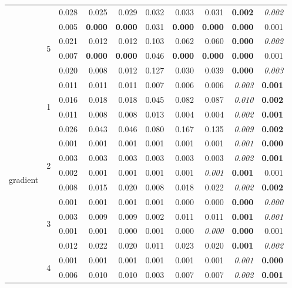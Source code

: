 \documentclass[authoryear, review, 11pt]{elsarticle}
\begin{document}
\begin{table}
\begin{center}
{\begin{tabular}{ccrrrrrrrr}
   &  & 0.028 & 0.025 & 0.029 & 0.032 & 0.033 & 0.031 & \textbf{0.002} & \emph{0.002} \\ 
  \cline{3-10}
   & \multirow{4}{*}{5} & 0.005 & \textbf{0.000} & \textbf{0.000} & 0.031 & \textbf{0.000} & \textbf{0.000} & \textbf{0.000} & 0.001 \\ 
   &  & 0.021 & 0.012 & 0.012 & 0.103 & 0.062 & 0.060 & \textbf{0.000} & \emph{0.002} \\ 
   &  & 0.007 & \textbf{0.000} & \textbf{0.000} & 0.046 & \textbf{0.000} & \textbf{0.000} & \textbf{0.000} & 0.001 \\ 
   &  & 0.020 & 0.008 & 0.012 & 0.127 & 0.030 & 0.039 & \textbf{0.000} & \emph{0.003} \\ 
  \hline
  \multirow{20}{*}{gradient} & \multirow{4}{*}{1} & 0.011 & 0.011 & 0.011 & 0.007 & 0.006 & 0.006 & \emph{0.003} & \textbf{0.001} \\ 
   &  & 0.016 & 0.018 & 0.018 & 0.045 & 0.082 & 0.087 & \emph{0.010} & \textbf{0.002} \\ 
   &  & 0.011 & 0.008 & 0.008 & 0.013 & 0.004 & 0.004 & \emph{0.002} & \textbf{0.001} \\ 
   &  & 0.026 & 0.043 & 0.046 & 0.080 & 0.167 & 0.135 & \emph{0.009} & \textbf{0.002} \\ 
  \cline{3-10}
   & \multirow{4}{*}{2} & 0.001 & 0.001 & 0.001 & 0.001 & 0.001 & 0.001 & \emph{0.001} & \textbf{0.000} \\ 
   &  & 0.003 & 0.003 & 0.003 & 0.003 & 0.003 & 0.003 & \emph{0.002} & \textbf{0.001} \\ 
   &  & 0.002 & 0.001 & 0.001 & 0.001 & 0.001 & \emph{0.001} & \textbf{0.001} & 0.001 \\ 
   &  & 0.008 & 0.015 & 0.020 & 0.008 & 0.018 & 0.022 & \emph{0.002} & \textbf{0.002} \\ 
  \cline{3-10}
   & \multirow{4}{*}{3} & 0.001 & 0.001 & 0.001 & 0.001 & 0.000 & 0.000 & \textbf{0.000} & \emph{0.000} \\ 
   &  & 0.003 & 0.009 & 0.009 & 0.002 & 0.011 & 0.011 & \textbf{0.001} & \emph{0.001} \\ 
   &  & 0.001 & 0.001 & 0.000 & 0.001 & 0.000 & \emph{0.000} & \textbf{0.000} & 0.001 \\ 
   &  & 0.012 & 0.022 & 0.020 & 0.011 & 0.023 & 0.020 & \textbf{0.001} & \emph{0.002} \\ 
  \cline{3-10}
   & \multirow{4}{*}{4} & 0.001 & 0.001 & 0.001 & 0.001 & 0.001 & 0.001 & \emph{0.001} & \textbf{0.000} \\ 
   &  & 0.006 & 0.010 & 0.010 & 0.003 & 0.007 & 0.007 & \emph{0.002} & \textbf{0.001} \\ 

\end{tabular}}
\end{center}
\end{table}
\end{document}
